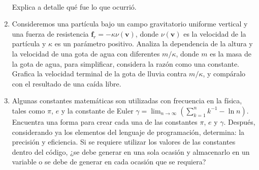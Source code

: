 \documentclass[12pt]{article}
\begin{document}
\begin{enumerate}
\\Explica a detalle qu\'{e} fue lo que ocurri\'{o}.
\item Consideremos una part\'{i}cula bajo un campo gravitatorio uniforme vertical y una fuerza de resistencia $\mathbf{f}_{r} = - \kappa \nu(\mathbf{v})$, donde $\nu(\mathbf{v})$ es la velocidad de la part\'{i}cula y $\kappa$ es un par\'{a}metro positivo. Analiza la dependencia de la altura y la velocidad de una gota de agua con diferentes $m/\kappa$, donde $m$ es la masa de la gota de agua, para simplificar, considera la raz\'{o}n como una constante. Grafica la velocidad terminal de la gota de lluvia contra $m/\kappa$, y comp\'{a}ralo con el resultado de una ca\'{i}da libre.
\item Algunas constantes matem\'{a}ticas son utilizadas con frecuencia en la f\'{i}sica, tales como $\pi$, $e$ y la constante de Euler $\gamma = \lim_{n\rightarrow \infty} (\sum_{k=1}^{n} k^{-1} - \ln n)$. Encuentra una forma para crear cada una de las constantes $\pi$, $e$ y $\gamma$. Despu\'{e}s, considerando ya los elementos del lenguaje de programaci\'{o}n, determina: la precisi\'{o}n y eficiencia. Si se requiere utilizar los valores de las constantes dentro del c\'{o}digo, ¿se debe generar en una sola ocasi\'{o}n y almacenarlo en un variable o se debe de generar en cada ocasi\'{o}n que se requiera?
\end{enumerate}
\end{document}
